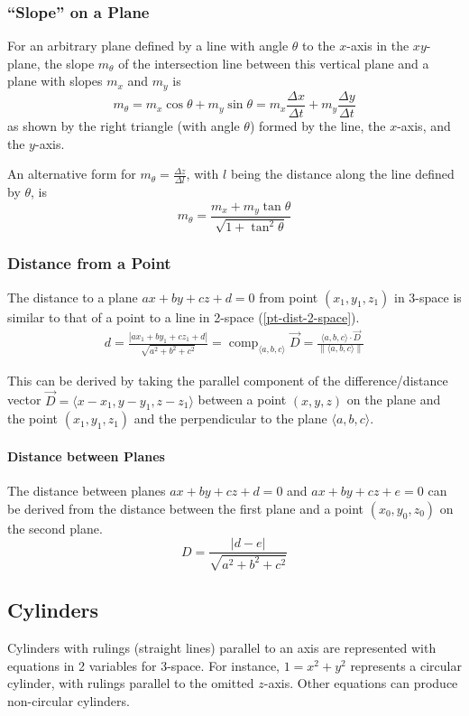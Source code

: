 \documentclass{article}
\DeclareMathOperator{\comp}{comp}
\newcommand{\vect}[1]{\ensuremath{\overrightarrow{#1}}}
\newcommand{\magnitude}[1]{\ensuremath{\lVert #1 \rVert}}
\newcommand{\abs}[1]{\left|#1\right|}
\begin{document}
\subsubsection{``Slope'' on a Plane}
For an arbitrary plane defined by a line with angle $\theta$ to the $x$-axis in the $xy$-plane, the slope $m_\theta$ of the intersection line between this vertical plane and a plane with slopes $m_x$ and $m_y$ is
$$m_\theta = m_x\cos{\theta} + m_y\sin{\theta}= m_x\frac{\Delta x}{\Delta t} + m_y\frac{\Delta y}{\Delta t}$$ as shown by the right triangle (with angle $\theta$) formed by the line, the $x$-axis, and the $y$-axis.

An alternative form for $m_\theta=\frac{\Delta z}{\Delta l}$, with $l$ being the distance along the line defined by $\theta$, is $$m_\theta = \frac{m_x+m_y\tan{\theta}}{\sqrt{1+\tan^2{\theta}}}$$

\subsubsection{Distance from a Point}
The distance to a plane $ax+by+cz+d=0$ from point $(x_1, y_1, z_1)$ in 3-space is similar to that of a point to a line in 2-space (\ref{pt-dist-2-space}).
\begin{align*}
d=\frac{\abs{ax_1+by_1+cz_1+d}}{\sqrt{a^2+b^2+c^2}} =
\comp_{\langle a, b, c \rangle} \vect{D} = \frac{\langle a, b, c \rangle \cdot \vect{D}}{\magnitude{\langle a, b, c \rangle}}
\end{align*}

This can be derived by taking the parallel component of the difference/distance vector $\vect{D} = \langle x-x_1, y-y_1, z-z_1\rangle$ between a point $(x,y,z)$ on the plane and the point $(x_1, y_1, z_1)$ and the perpendicular to the plane $\langle a, b, c \rangle$.

\paragraph{Distance between Planes}
The distance between planes $ax + by + cz + d = 0$ and $ax + by + cz + e = 0$ can be derived from the distance between the first plane and a point $(x_0, y_0, z_0)$ on the second plane.
\[
D=\frac{\abs{d-e}}{\sqrt{a^2+b^2+c^2}}
\]

\subsection{Cylinders}
Cylinders with rulings (straight lines) parallel to an axis are represented with equations in 2 variables for 3-space.
For instance, $1 = x^2 + y^2$ represents a circular cylinder, with rulings parallel to the omitted $z$-axis.
Other equations can produce non-circular cylinders.
\end{document}
